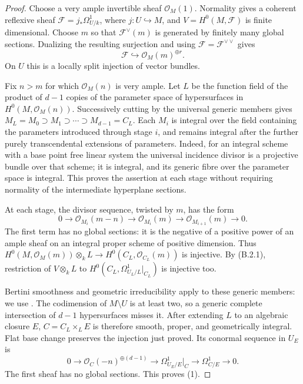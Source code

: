 \begin{proof}
Choose a very ample invertible sheaf $\mathcal O_M(1)$.  Normality
gives a coherent reflexive sheaf
$\mathcal F=j_*\Omega^1_{U/k}$, where $j:U\hookrightarrow M$,
and $V=H^0(M,\mathcal F)$ is finite dimensional.  Choose $m$ so
that $\mathcal F^\vee(m)$ is generated by finitely many global
sections.  Dualizing the resulting surjection and using
$\mathcal F=\mathcal F^{\vee\vee}$ gives
\[
 \mathcal F\hookrightarrow\mathcal O_M(m)^{\oplus r}.
 \tag{B.2.1}
\]
On $U$ this is a locally split injection of vector bundles.

Fix $n>m$ for which $\mathcal O_M(n)$ is very ample.  Let $L$ be
the function field of the product of $d-1$ copies of the
parameter space of hypersurfaces in
$H^0(M,\mathcal O_M(n))$.  Successively cutting by the universal
generic members gives $M_L=M_0\supset M_1\supset\cdots
\supset M_{d-1}=C_L$.  Each $M_i$ is integral over the field
containing the parameters introduced through stage $i$, and
remains integral after the further purely transcendental
extensions of parameters.  Indeed, for an integral scheme with
a base point free linear system the universal incidence divisor
is a projective bundle over that scheme; it is integral, and its
generic fibre over the parameter space is integral.  This proves
the assertion at each stage without requiring normality of the
intermediate hyperplane sections.

At each stage, the divisor sequence, twisted by $m$, has the form
\[
 0\longrightarrow\mathcal O_{M_i}(m-n)
 \longrightarrow\mathcal O_{M_i}(m)
 \longrightarrow\mathcal O_{M_{i+1}}(m)
 \longrightarrow0.
\]
The first term has no global sections: it is the negative of a
positive power of an ample sheaf on an integral proper scheme
of positive dimension.  Thus
$H^0(M,\mathcal O_M(m))\otimes_kL\to
H^0(C_L,\mathcal O_{C_L}(m))$ is injective.  By (B.2.1),
restriction of $V\otimes_kL$ to
$H^0(C_L,\Omega^1_{U_L/L}|_{C_L})$ is injective too.

Bertini smoothness and geometric irreducibility apply to these
generic members: we use \cite[Tags 0FD6 and 0G4F]{StacksB}.
The codimension of $M\setminus U$ is at least two, so a generic
complete intersection of $d-1$ hypersurfaces misses it.  After
extending $L$ to an algebraic closure $E$, $C=C_L\times_LE$ is
therefore smooth, proper, and geometrically integral.  Flat base
change preserves the injection just proved.  Its conormal sequence
in $U_E$ is
\[
 0\longrightarrow\mathcal O_C(-n)^{\oplus(d-1)}
 \longrightarrow\Omega^1_{U_E/E}|_C
 \longrightarrow\Omega^1_{C/E}\longrightarrow0.
\]
The first sheaf has no global sections.  This proves (1).


\end{proof}
